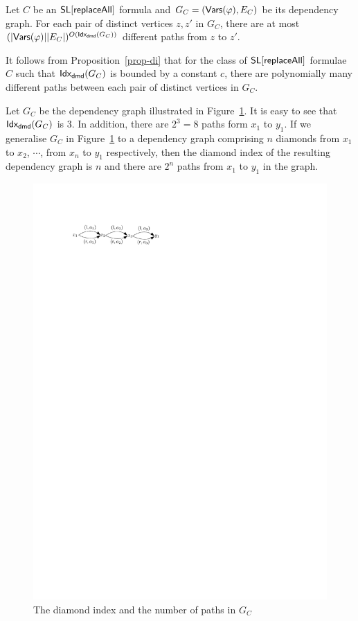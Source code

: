 \begin{proposition}\label{prop-di}
Let $C$  be an  $\mathsf{SL}[\mathsf{replaceAll}]$ formula and $G_C=(\mathsf{Vars}(\varphi), E_C)$ be its dependency graph. For each pair of distinct vertices $z,z'$ in $G_C$, there are at most $(|\mathsf{Vars}(\varphi)||E_C|)^{O({\sf Idx_{dmd}}(G_C))}$ different paths from $z$ to $z'$.
\end{proposition}
It follows from Proposition~\ref{prop-di} that for the class of $\mathsf{SL}[\mathsf{replaceAll}]$ formulae $C$ such that ${\sf Idx_{dmd}}(G_C)$ is bounded by a constant $c$,  there are polynomially many different paths between each pair of distinct vertices in $G_C$.

\begin{example}
Let $G_C$ be the dependency graph illustrated in Figure~\ref{fig-dmdidx-exmp}. It is easy to see that ${\sf Idx_{dmd}}(G_C)$ is $3$. In addition, there are $2^3=8$ paths form $x_1$ to $y_1$. If we generalise $G_C$ in Figure~\ref{fig-dmdidx-exmp} to a dependency graph comprising $n$ diamonds from $x_1$ to $x_2$, $\cdots$, from $x_n$ to $y_1$ respectively, then the diamond index of the resulting dependency graph is $n$ and there are $2^n$ paths from $x_1$ to $y_1$ in the graph.
\begin{figure}[htbp]
\begin{center}
\includegraphics[scale=0.7]{dmdidx-example.pdf}
\end{center}
\caption{The diamond index  and the number of paths in $G_C$}\label{fig-dmdidx-exmp}
\end{figure}
\end{example}

